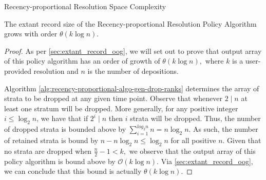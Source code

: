 \begin{theorem}{Recency-proportional Resolution Space Complexity}
\label{thm:recency-proportional-resolution-algo-space-complexity}

The \gls{extant record size} of the Recency-proportional Resolution Policy Algorithm grows with order $\mathcal{\theta}{(k \log n)}.$

\end{theorem}

\begin{proof}
\label{prf:recency-proportional-resolution-algo-space-complexity}
As per \ref{sec:extant_record_oog}, we will set out to prove that output array of this policy algorithm has an order of growth of $\mathcal{\theta}{(k \log{n})},$ where $k$ is a user-provided resolution and $n$ is the number of depositions.

Algorithm \ref{alg:recency-proportional-algo-gen-drop-ranks} determines the array of strata to be dropped at any given time point.
Observe that whenever $2 \mid n$ at least one stratum will be dropped.
More generally, for any positive integer $i \le \log_2{n}$, we have that if $2^i \mid n$ then $i$ strata will be dropped. 
Thus, the number of dropped strata is bounded above by $\sum_{i=1}^{log_2{n}} n = n \log_2{n}.$
As such, the number of retained strata is bound by $n - n \log_2{n} \le \log_2{n}$ for all positive $n.$
Given that no strata are dropped when $\frac{n}{2} - 1 < k,$ we observe that the output array of this policy algorithm is bound above by $\mathcal{O}{(k \log{n})}.$
Via \ref{sec:extant_record_oog}, we can conclude that this bound is actually $\mathcal{\theta}{(k \log{n})}.$
\end{proof}
